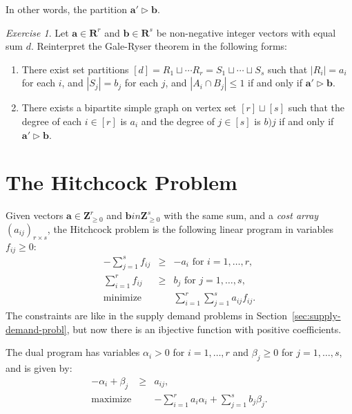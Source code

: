 \documentclass{amsbook}
\newcommand{\bb}{\mathbf b}
\renewcommand{\aa}{\mathbf a}
\newcommand{\RR}{\mathbf R}
\newcommand{\ZZ}{\mathbf Z}
\theoremstyle{definition}
\theoremstyle{remark}
\newtheorem{exercise}[theorem]{Exercise}
\begin{document}
In other words, the partition $\aa'\rhd \bb$.
\begin{exercise}
  Let $\aa\in \RR^r$ and $\bb\in \RR^s$ be non-negative integer vectors with equal sum $d$.
  Reinterpret the Gale-Ryser theorem in the following forms:
  \begin{enumerate}
  \item There exist set partitions $[d]=R_1\sqcup \dotsb R_r=S_1\sqcup\dotsb\sqcup S_s$ such that $|R_i|=a_i$ for each $i$, and $|S_j|=b_j$ for each $j$, and $|A_i\cap B_j|\leq 1$ if and only if $\aa'\rhd \bb$.
  \item There exists a bipartite simple graph on vertex set $[r]\sqcup [s]$ such that the degree of each $i\in [r]$ is $a_i$ and the degree of $j\in [s]$ is $b)j$ if and only if $\aa'\rhd \bb$.
  \end{enumerate}
\end{exercise}

\section{The Hitchcock Problem}
\label{sec:hitchcock-problem}

Given vectors $\aa\in \ZZ_{\geq 0}^r$ and $\bb in \ZZ_{\geq 0}^s$ with the same sum, and a \emph{cost array} $(a_{ij})_{r\times s}$, the Hitchcock problem is the following linear program in variables $f_{ij}\geq 0$:
\begin{equation}
  \tag{H}
  \label{eq:hitchcock}
  \begin{array}{rcl}
    -\sum_{j=1}^s f_{ij} & \geq & - a_i \text{ for }i=1,\dotsc,r,\\
    \sum_{i=1}^r f_{ij} & \geq & b_j \text{ for }j=1,\dotsc,s,\\
    \hline
    \text{minimize} && \sum_{i=1}^r\sum_{j=1}^s a_{ij}f_{ij}.
  \end{array}
\end{equation}
The constraints are like in the supply demand problems in Section~\ref{sec:supply-demand-probl}, but now there is an ibjective function with positive coefficients.

The dual program has variables $\alpha_i>0$ for $i=1,\dotsc,r$ and $\beta_j\geq 0$ for $j=1,\dotsc,s$, and is given by:
\begin{equation}
  \tag{DH}
  \label{eq:dual-hitch}
  \begin{array}{rcl}
    -\alpha_i + \beta_j & \geq & a_{ij},\\
    \text{maximize} && -\sum_{i=1}^r a_i\alpha_i + \sum_{j=1}^s b_j\beta_j.
  \end{array}
\end{equation}
\end{document}
